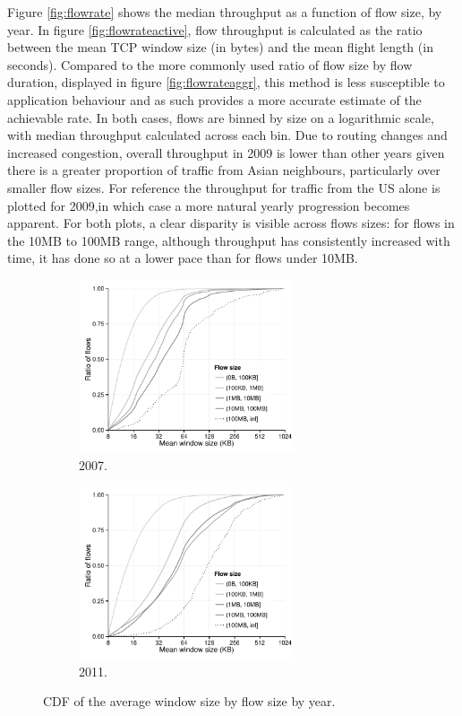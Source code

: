 Figure \ref{fig:flowrate} shows the median throughput as a function of flow size, by year.
In figure \ref{fig:flowrateactive}, flow throughput is calculated as the ratio between the mean \ac{TCP} window size (in bytes) and the mean flight length (in seconds).
Compared to the more commonly used ratio of flow size by flow duration, displayed in figure \ref{fig:flowrateaggr}, this method is less susceptible to application behaviour and as such provides a more accurate estimate of the achievable rate.
In both cases, flows are binned by size on a logarithmic scale, with median throughput calculated across each bin.
Due to routing changes and increased congestion, overall throughput in 2009 is lower than other years given there is a greater proportion of traffic from Asian neighbours, particularly over smaller flow sizes.
For reference the throughput for traffic from the US alone is plotted for 2009,in which case a more natural yearly progression becomes apparent.
For both plots, a clear disparity is visible across flows sizes: for flows in the 10MB to 100MB range, although throughput has consistently increased with time, it has done so at a lower pace than for flows under 10MB. 

\begin{figure}
    \begin{subfigure}[b]{.5\linewidth}
        \centering
        \includegraphics[width=2.5in]{figures/malawi/windowsize2007}
        \caption{2007.}
    \end{subfigure}%
    \begin{subfigure}[b]{.5\linewidth}
        \centering
        \includegraphics[width=2.5in]{figures/malawi/windowsize2011}
        \caption{2011.}
    \end{subfigure}%
    \caption{\acs{CDF} of the average window size by flow size by year. \label{fig:windowsize}}
\end{figure}
 
